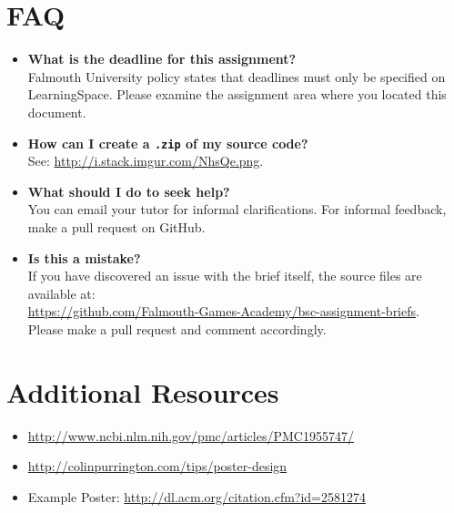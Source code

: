 \documentclass{../fal_assignment}
\begin{document}
\section*{FAQ}

\begin{itemize}
	\item 	\textbf{What is the deadline for this assignment?} \\ 
    		Falmouth University policy states that deadlines must only be specified on LearningSpace. Please examine the assignment area where you located this document.
    		
    	\item 	\textbf{How can I create a \texttt{.zip} of my source code?} \\ 
    		See: \url{http://i.stack.imgur.com/NhsQe.png}. 
    		
	\item 	\textbf{What should I do to seek help?} \\ 
    		You can email your tutor for informal clarifications. For informal feedback, make a pull request on GitHub. 
    		
    	\item 	\textbf{Is this a mistake?} \\ 	
    		If you have discovered an issue with the brief itself, the source files are available at: \\
    		\url{https://github.com/Falmouth-Games-Academy/bsc-assignment-briefs}.\\
    		 Please make a pull request and comment accordingly.
\end{itemize}

\section*{Additional Resources}

\begin{itemize}
    \item \url{http://www.ncbi.nlm.nih.gov/pmc/articles/PMC1955747/}
    \item \url{http://colinpurrington.com/tips/poster-design}
    \item Example Poster: \url{http://dl.acm.org/citation.cfm?id=2581274}
\end{itemize}
\end{document}
